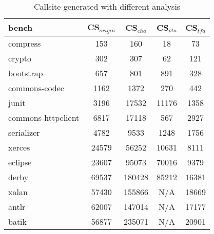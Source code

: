 \documentclass{llncs}
\begin{document}
\begin{table}[!htbp]\centering
\caption{Callsite generated with different analysis}
\begin{tabular}{lcccc}
	\hline
	\textbf{bench} & \textbf{CS$_{origin}$} & \textbf{CS$_{cha}$} & \textbf{CS$_{pta}$} & \textbf{CS$_{tfa}$} \\
	\hline
	compress & 153 & 160 & 18 & 73 \\
	crypto & 302 & 307 & 62 & 121 \\
	bootstrap & 657 & 801 & 891 & 328 \\
	commons-codec & 1162 & 1372 & 270 & 442 \\
	junit & 3196 & 17532 & 11176 & 1358 \\
	commons-httpclient & 6817 & 17118 & 567 & 2927 \\
	serializer & 4782 & 9533 & 1248 & 1756 \\
	xerces & 24579 & 56252 & 10631 & 8111 \\
	eclipse & 23607 & 95073 & 70016 & 9379 \\
	derby & 69537 & 180428 & 85212 & 16381 \\
	xalan & 57430 & 155866 & N/A & 18669 \\
	antlr & 62007 & 147014 & N/A & 17177 \\
	batik & 56877 & 235071 & N/A & 20901 \\
	\hline
\end{tabular}
\label{experiment:Callsite}
\end{table}




\end{document}
